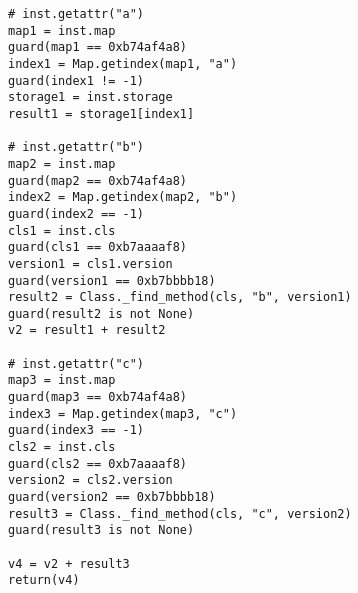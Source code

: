 \begin{Verbatim}
# inst.getattr("a")
map1 = inst.map
guard(map1 == 0xb74af4a8)
index1 = Map.getindex(map1, "a")
guard(index1 != -1)
storage1 = inst.storage
result1 = storage1[index1]

# inst.getattr("b")
map2 = inst.map
guard(map2 == 0xb74af4a8)
index2 = Map.getindex(map2, "b")
guard(index2 == -1)
cls1 = inst.cls
guard(cls1 == 0xb7aaaaf8)
version1 = cls1.version
guard(version1 == 0xb7bbbb18)
result2 = Class._find_method(cls, "b", version1)
guard(result2 is not None)
v2 = result1 + result2

# inst.getattr("c")
map3 = inst.map
guard(map3 == 0xb74af4a8)
index3 = Map.getindex(map3, "c")
guard(index3 == -1)
cls2 = inst.cls
guard(cls2 == 0xb7aaaaf8)
version2 = cls2.version
guard(version2 == 0xb7bbbb18)
result3 = Class._find_method(cls, "c", version2)
guard(result3 is not None)

v4 = v2 + result3
return(v4)
\end{Verbatim}
